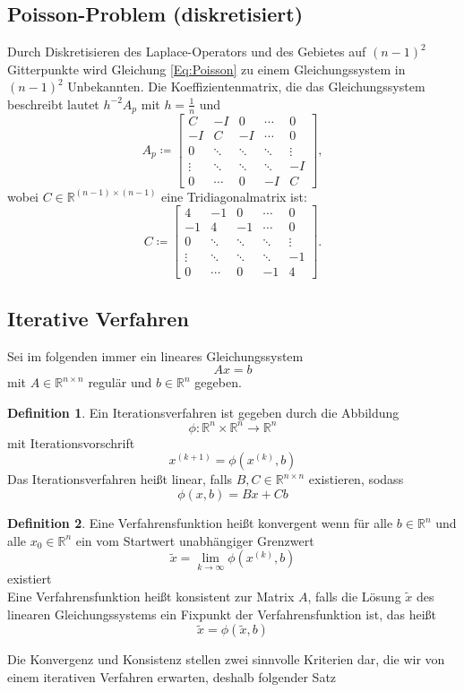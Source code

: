 \documentclass{scrartcl}
\newcommand\R{\mathbb{R}}
\theoremstyle{definition}
\newtheorem{definition}{Definition}
\begin{document}
\subsection{Poisson-Problem (diskretisiert)}
Durch Diskretisieren des Laplace-Operators und des Gebietes auf \((n-1)^2\) Gitterpunkte wird Gleichung \ref{Eq:Poisson} zu einem Gleichungssystem in \((n-1)^2\) Unbekannten. Die Koeffizientenmatrix, die das Gleichungssystem beschreibt lautet \(h^{-2}A_p\) mit \(h = \frac{1}{n}\) und
\[
    A_p \coloneq \begin{bmatrix}
        C      & -I     & 0      & \cdots & 0      \\
        -I     & C      & -I     & \cdots & 0      \\
        0      & \ddots & \ddots & \ddots & \vdots \\
        \vdots & \ddots & \ddots & \ddots & -I     \\
        0      & \cdots & 0      & -I     & C
    \end{bmatrix},
\]
wobei \(C \in \R^{(n-1) \times (n-1)}\) eine Tridiagonalmatrix ist:
\[
    C \coloneq \begin{bmatrix}
        4      & -1     & 0      & \cdots & 0      \\
        -1     & 4      & -1     & \cdots & 0      \\
        0      & \ddots & \ddots & \ddots & \vdots \\
        \vdots & \ddots & \ddots & \ddots & -1     \\
        0      & \cdots & 0      & -1     & 4
    \end{bmatrix}.
\]

\subsection{Iterative Verfahren}
Sei im folgenden immer ein lineares Gleichungssystem
\[Ax=b\]
mit \(A \in \R^{n \times n}\) regulär und \(b \in \R^n\) gegeben.
\begin{definition}
Ein Iterationsverfahren ist gegeben durch die Abbildung
\[\phi:\R^n \times \R^n \rightarrow \R^n\]
mit Iterationsvorschrift
\[x^{(k+1)}=\phi(x^{(k)},b)\]
Das Iterationsverfahren heißt linear, falls \(B,C \in \R^{n \times n}\) existieren, sodass
\[\phi(x,b)=Bx+Cb\]
\end{definition}


\begin{definition}
Eine Verfahrensfunktion heißt konvergent wenn für alle \(b \in \R^n\) und alle \(x_0 \in \R^n\) ein vom Startwert unabhängiger Grenzwert
\[\tilde{x} = \lim_{k \to \infty} \phi(x^{(k)},b)\]
existiert\\
Eine Verfahrensfunktion heißt konsistent zur Matrix \(A\), falls die Lösung \(\tilde{x}\) des linearen Gleichungssystems ein Fixpunkt der Verfahrensfunktion ist, das heißt
\[\tilde{x} = \phi(\tilde{x},b)\]
\end{definition}
Die Konvergenz und Konsistenz stellen zwei sinnvolle Kriterien dar, die wir von einem iterativen Verfahren erwarten, deshalb folgender Satz
\end{document}
